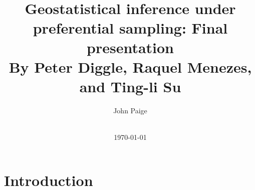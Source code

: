 \documentclass[xcolor=svgnames]{beamer}
\title{~\\~\\Geostatistical inference under preferential sampling: Final presentation
\\
{\small By Peter Diggle, Raquel Menezes, and Ting-li Su}
}
\author[John Paige]{John Paige}
\date[\today]{\vspace{.3in} \small \\ \today}
\institute[University of Washington] %
{
  \vspace{.1in} \\ Statistics Department\\
{\sc  University of Washington  }
}
\begin{document}
\setlength{\columnsep}{.5cm}


\frame{\titlepage}




\section{Introduction}



\end{document}
